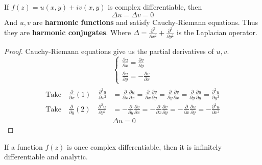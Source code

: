 \begin{theorem}
    If $f(z) = u(x,y) + iv(x,y)$ is complex differentiable, then
    $$ \Delta u  = \Delta v = 0$$
    And $u, v$ are \textbf{harmonic functions} and satisfy Cauchy-Riemann equations. Thus they are \textbf{harmonic conjugates}.
    Where $\Delta = \frac{\partial^2}{\partial x^2} + \frac{\partial^2}{\partial y^2}$ is the Laplacian operator.
\end{theorem}

\begin{proof}
    Cauchy-Riemann equations give us the partial derivatives of $u, v$.
    $$
        \begin{cases}
            \frac{\partial u}{\partial x} = \frac{\partial v}{\partial y} \\
            \frac{\partial u}{\partial y} = -\frac{\partial v}{\partial x}
        \end{cases}$$
    \begin{align*}                                                                                                                                                                                                                      \\
        \text{Take} \quad \frac{\partial}{\partial x}(1) \quad \frac{\partial^2 u}{\partial x^2} & = \frac{\partial}{\partial x} \frac{\partial u}{\partial x} = \frac{\partial}{\partial x} \frac{\partial v}{\partial y} = \frac{\partial}{\partial y} \frac{\partial v}{\partial x} = \frac{\partial}{\partial y} \frac{\partial u}{\partial y} = \frac{\partial^2 u}{\partial y^2} \\
        \text{Take} \quad \frac{\partial}{\partial y}(2) \quad \frac{\partial^2 u}{\partial y^2} & = -\frac{\partial}{\partial y} \frac{\partial v}{\partial x} = -\frac{\partial}{\partial x} \frac{\partial v}{\partial y} = -\frac{\partial}{\partial x} \frac{\partial u}{\partial y} = -\frac{\partial^2 u}{\partial x^2}                                                         \\
                                                                                                 & \Delta u = 0
    \end{align*}
\end{proof}

\begin{corollary}
    If a function $f(z)$ is once complex differentiable, then it is infinitely differentiable and analytic.
\end{corollary}

